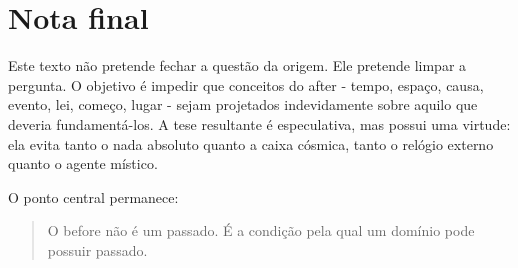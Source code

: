 \documentclass[11pt,a4paper]{article}
\begin{document}
\section*{Nota final}

Este texto não pretende fechar a questão da origem. Ele pretende limpar a pergunta. O objetivo é impedir que conceitos do after - tempo, espaço, causa, evento, lei, começo, lugar - sejam projetados indevidamente sobre aquilo que deveria fundamentá-los. A tese resultante é especulativa, mas possui uma virtude: ela evita tanto o nada absoluto quanto a caixa cósmica, tanto o relógio externo quanto o agente místico.

O ponto central permanece:

\begin{quote}
O before não é um passado. É a condição pela qual um domínio pode possuir passado.
\end{quote}
\end{document}
